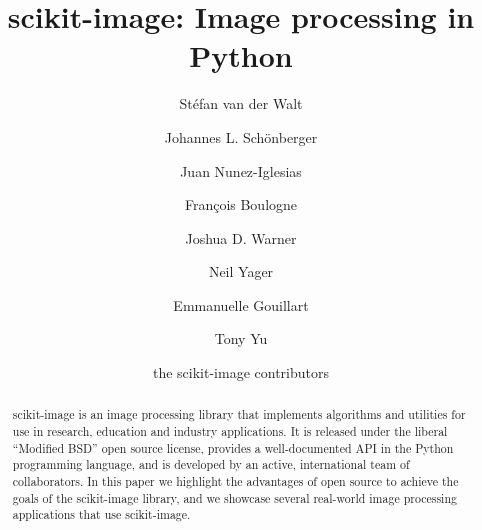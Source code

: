 \documentclass[fleqn,12pt]{wlpeerj}
\begin{document}
\title{scikit-image: Image processing in Python}

\author[1,2]{Stéfan van der Walt}
\author[3]{Johannes L. Schönberger}
\author[4]{Juan Nunez-Iglesias}
\author[5]{François Boulogne}
\author[6]{Joshua D. Warner}
\author[7]{Neil Yager}
\author[8]{Emmanuelle Gouillart}
\author[9]{Tony Yu}
\author[10]{the scikit-image contributors}



\begin{abstract}
  scikit-image is an image processing library that implements algorithms and utilities for use in research, education and industry applications. It is released under the liberal ``Modified BSD'' open source license, provides a well-documented API in the Python programming language, and is developed by an active, international team of collaborators. In this paper we highlight the advantages of open source to achieve the goals of the scikit-image library, and we showcase several real-world image processing applications that use scikit-image.
\end{abstract}

\flushbottom
\maketitle
\thispagestyle{empty}

\end{document}

